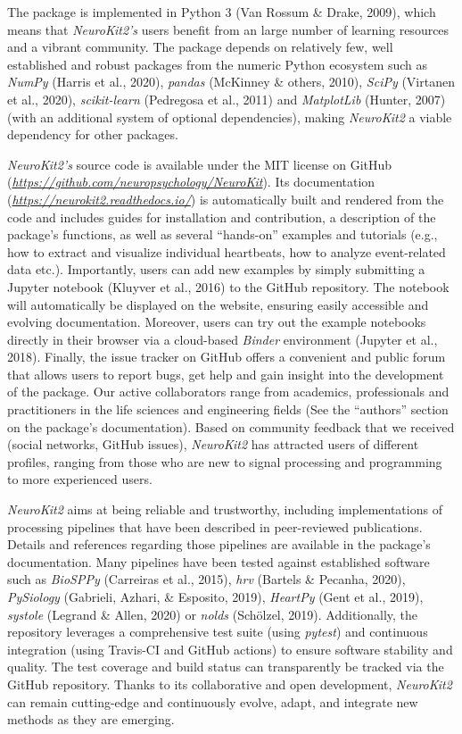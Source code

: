 \documentclass[
  english,
  man,floatsintext]{apa6}
\begin{document}
The package is implemented in Python 3 (Van Rossum \& Drake, 2009), which means that \emph{NeuroKit2's} users benefit from an large number of learning resources and a vibrant community. The package depends on relatively few, well established and robust packages from the numeric Python ecosystem such as \emph{NumPy} (Harris et al., 2020), \emph{pandas} (McKinney \& others, 2010), \emph{SciPy} (Virtanen et al., 2020), \emph{scikit-learn} (Pedregosa et al., 2011) and \emph{MatplotLib} (Hunter, 2007) (with an additional system of optional dependencies), making \emph{NeuroKit2} a viable dependency for other packages.

\emph{NeuroKit2's} source code is available under the MIT license on GitHub (\emph{\url{https://github.com/neuropsychology/NeuroKit}}). Its documentation (\emph{\url{https://neurokit2.readthedocs.io/}}) is automatically built and rendered from the code and includes guides for installation and contribution, a description of the package's functions, as well as several \enquote{hands-on} examples and tutorials (e.g., how to extract and visualize individual heartbeats, how to analyze event-related data etc.). Importantly, users can add new examples by simply submitting a Jupyter notebook (Kluyver et al., 2016) to the GitHub repository. The notebook will automatically be displayed on the website, ensuring easily accessible and evolving documentation. Moreover, users can try out the example notebooks directly in their browser via a cloud-based \emph{Binder} environment (Jupyter et al., 2018). Finally, the issue tracker on GitHub offers a convenient and public forum that allows users to report bugs, get help and gain insight into the development of the package. Our active collaborators range from academics, professionals and practitioners in the life sciences and engineering fields (See the \enquote{authors} section on the package's documentation). Based on community feedback that we received (social networks, GitHub issues), \emph{NeuroKit2} has attracted users of different profiles, ranging from those who are new to signal processing and programming to more experienced users.

\emph{NeuroKit2} aims at being reliable and trustworthy, including implementations of processing pipelines that have been described in peer-reviewed publications. Details and references regarding those pipelines are available in the package's documentation. Many pipelines have been tested against established software such as \emph{BioSPPy} (Carreiras et al., 2015), \emph{hrv} (Bartels \& Pecanha, 2020), \emph{PySiology} (Gabrieli, Azhari, \& Esposito, 2019), \emph{HeartPy} (Gent et al., 2019), \emph{systole} (Legrand \& Allen, 2020) or \emph{nolds} (Schölzel, 2019). Additionally, the repository leverages a comprehensive test suite (using \emph{pytest}) and continuous integration (using Travis-CI and GitHub actions) to ensure software stability and quality. The test coverage and build status can transparently be tracked via the GitHub repository. Thanks to its collaborative and open development, \emph{NeuroKit2} can remain cutting-edge and continuously evolve, adapt, and integrate new methods as they are emerging.
\end{document}
